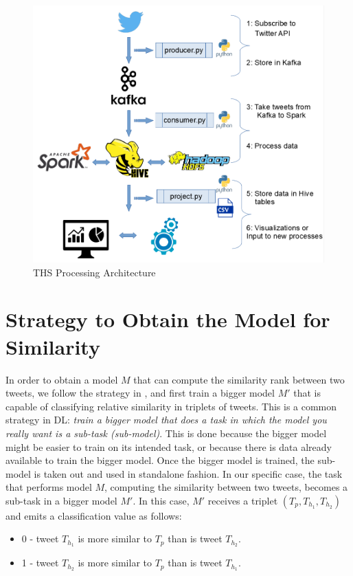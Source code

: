 \documentclass[12pt]{report}
\begin{document}
\begin{figure}[H]	
	\centering
	\includegraphics[width=150mm, scale = 1]{images/6_ths_system.png}	
	\caption{\ac{THS} Processing Architecture}	
	\label{figure:ths_system}
\end{figure}

\section{Strategy to Obtain the Model for Similarity \label{strategy}}
In order to obtain a model $M$ that can compute the similarity rank between two tweets, we follow the strategy in \cite{Wang2014}, and first train a bigger model $M'$
that is capable of classifying relative similarity in triplets of tweets. This is a common strategy in \ac{DL}: {\em train a bigger model that does a task in which the model you really want is  
	a sub-task (sub-model)}. This is done because the bigger model might be easier to train on its intended task, or because there is data already available to train the bigger model.  Once the bigger model is trained, the sub-model is taken out and used in standalone fashion. In our specific case, the task that performs model $M$, computing the similarity between two tweets, becomes a sub-task in a bigger
model $M'$. In this case, $M'$ receives a triplet $(T_p, T_{h_1}, T_{h_2})$ and emits a classification value as follows: 

\begin{itemize}
	\item 0 - tweet $T_{h_1}$ is more similar to $T_p$ than is tweet $T_{h_2}$.
	\item 1 - tweet $T_{h_2}$ is more similar to $T_p$ than is tweet $T_{h_1}$.
\end{itemize}
\end{document}
